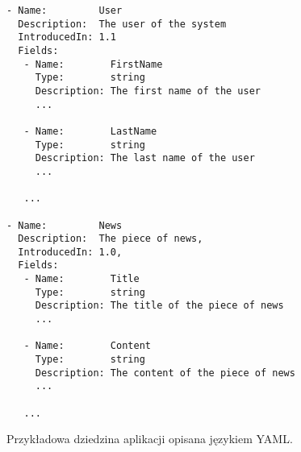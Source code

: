 \begin{figure}[!ht]
\begin{verbatim}
- Name:         User
  Description:  The user of the system
  IntroducedIn: 1.1
  Fields:
   - Name:        FirstName
     Type:        string
     Description: The first name of the user
     ...
     
   - Name:        LastName
     Type:        string
     Description: The last name of the user
     ...
     
   ...
   
- Name:         News
  Description:  The piece of news,
  IntroducedIn: 1.0,
  Fields:
   - Name:        Title
     Type:        string
     Description: The title of the piece of news
     ...
     
   - Name:        Content
     Type:        string
     Description: The content of the piece of news
     ...
     
   ...
\end{verbatim}

\caption{Przykładowa dziedzina aplikacji opisana językiem YAML.}
\label{fig:implementation_core:yaml}
\end{figure}
